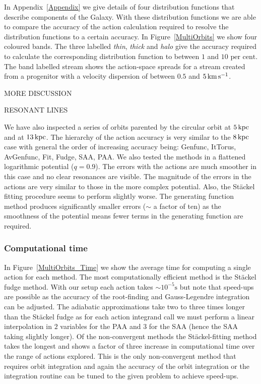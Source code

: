 \documentclass[useAMS,usenatbib,fleqn,a4paper]{mn2e}
\def\kpc{\,{\rm kpc}}
\def\kms{\,{\rm km\,s^{-1}}}
\def\percent{\text{ per cent}}
\def\percent{\text{ per cent}}
\begin{document}
In Appendix~\ref{Appendix} we give details of four distribution functions that describe components of the Galaxy. With these distribution functions we are able to compare the accuracy of the action calculation required to resolve the distribution functions to a certain accuracy. In Figure~\ref{MultiOrbits} we show four coloured bands. The three labelled \emph{thin}, \emph{thick} and \emph{halo} give the accuracy required to calculate the corresponding distribution function to between $1$ and $10\percent$. The band labelled stream shows the action-space spreads for a stream created from a progenitor with a velocity dispersion of between $0.5$ and $5\kms$.

MORE DISCUSSION

RESONANT LINES

We have also inspected a series of orbits parented by the circular orbit at $5\kpc$ and at $13\kpc$. The hierarchy of the action accuracy is very similar to the $8\kpc$ case with general the order of increasing accuracy being: Genfunc, ItTorus, AvGenfunc, Fit, Fudge, SAA, PAA. We also tested the methods in a flattened logarithmic potential ($q=0.9$). The errors with the actions are much smoother in this case and no clear resonances are visible. The magnitude of the errors in the actions are very similar to those in the more complex potential. Also, the St\"ackel fitting procedure seems to perform slightly worse. The generating function method produces significantly smaller errors ($\sim$ a factor of ten) as the smoothness of the potential means fewer terms in the generating function are required.

\subsubsection{Computational time}
In Figure~\ref{MultiOrbits_Time} we show the average time for computing a single action for each method. The most computationally efficient method is the St\"ackel fudge method. With our setup each action takes $\sim10^{-5}\mathrm{s}$ but note that speed-ups are possible as the accuracy of the root-finding and Gauss-Legendre integration can be adjusted. The adiabatic approximations take two to three times longer than the St\"ackel fudge as for each action integrand call we must perform a linear interpolation in $2$ variables for the PAA and $3$ for the SAA (hence the SAA taking slightly longer). Of the non-convergent methods the St\"ackel-fitting method takes the longest and shows a factor of three increase in computational time over the range of actions explored. This is the only non-convergent method that requires orbit integration and again the accuracy of the orbit integration or the integration routine can be tuned to the given problem to achieve speed-ups.
\end{document}
